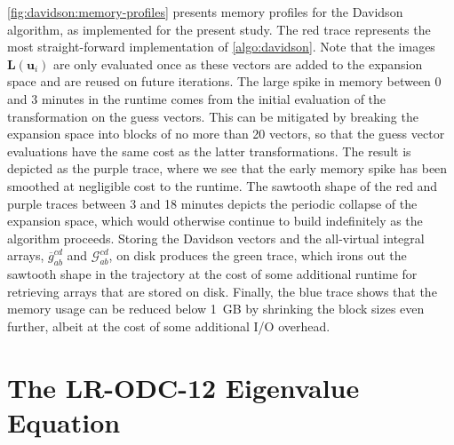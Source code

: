 \cref{fig:davidson:memory-profiles} presents memory profiles for the Davidson
algorithm, as implemented for the present study.
The red trace represents the most straight-forward implementation of
\cref{algo:davidson}.
Note that the images \(\mathbf{L}(\mathbf{u}_i)\) are only evaluated once as
these vectors are added to the expansion space and are reused on future
iterations.
The large spike in memory between 0 and 3 minutes in the runtime comes from the
initial evaluation of the transformation on the guess vectors.
This can be mitigated by breaking the expansion space into blocks of no more
than 20 vectors, so that the guess vector evaluations have the same cost as the
latter transformations.
The result is depicted as the purple trace, where we see that the early memory
spike has been smoothed at negligible cost to the runtime.
The sawtooth shape of the red and purple traces between 3 and 18 minutes
depicts the periodic collapse of the expansion space, which would otherwise
continue to build indefinitely as the algorithm proceeds.
Storing the Davidson vectors and the all-virtual integral arrays,
\(\overline{g}_{ab}^{cd}\) and \(\mathcal{G}_{ab}^{cd}\), on disk produces the
green trace, which irons out the sawtooth shape in the trajectory at the cost
of some additional runtime for retrieving arrays that are stored on disk.
Finally, the blue trace shows that the memory usage can be reduced below 1~GB by
shrinking the block sizes even further, albeit at the cost of some additional
I/O overhead.


\section{The LR-ODC-12 Eigenvalue Equation}
\label{sec:davidson:eig}

